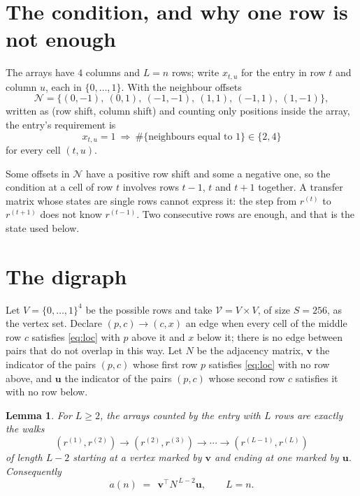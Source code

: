 \documentclass[11pt,a4paper]{article}
\theoremstyle{plain}
\newtheorem{lemma}[theorem]{Lemma}
\theoremstyle{definition}
\begin{document}
\section{The condition, and why one row is not enough}

The arrays have $4$ columns and $L=n$ rows; write $x_{t,u}$ for the entry in
row $t$ and column $u$, each in $\{0,\dots,1\}$. With the neighbour offsets
\[
\mathcal N=\{(0,-1),\ (0,1),\ (-1,-1),\ (1,1),\ (-1,1),\ (1,-1)\},
\]
written as (row shift, column shift) and counting only positions inside the array, the
entry's requirement is
\begin{equation}\label{eq:loc}
x_{t,u}=1\ \Rightarrow\ \#\{\text{neighbours equal to }1\}\in\{2,4\}
\end{equation}
for every cell $(t,u)$.

Some offsets in $\mathcal N$ have a positive row shift and some a negative one, so the
condition at a cell of row $t$ involves rows $t-1$, $t$ and $t+1$ together. A transfer
matrix whose states are single rows cannot express it: the step from $r^{(t)}$ to
$r^{(t+1)}$ does not know $r^{(t-1)}$. Two consecutive rows are enough, and that is
the state used below.

\section{The digraph}

Let $V=\{0,\dots,1\}^{4}$ be the possible rows and take
$\mathcal V=V\times V$, of size $S=256$, as the vertex set. Declare $(p,c)\to(c,x)$ an edge
when every cell of the middle row $c$ satisfies \eqref{eq:loc} with $p$ above it and $x$
below it; there is no edge between pairs that do not overlap in this way. Let $N$ be the
adjacency matrix, $\mathbf{v}$ the indicator of the pairs $(p,c)$ whose first row $p$
satisfies \eqref{eq:loc} with no row above, and $\mathbf{u}$ the indicator of
the pairs $(p,c)$ whose second row $c$ satisfies it with no row below.

\begin{lemma}\label{lem:walk}
For $L\ge2$, the arrays counted by the entry with $L$ rows are exactly the walks
\[
(r^{(1)},r^{(2)})\to(r^{(2)},r^{(3)})\to\cdots\to(r^{(L-1)},r^{(L)})
\]
of length $L-2$ starting at a vertex marked by $\mathbf{v}$ and ending at one marked by
$\mathbf{u}$. Consequently
\[
a(n)\;=\;\,\mathbf{v}^{\!\top}N^{\,L-2}\mathbf{u},\qquad L=n .
\]
\end{lemma}
\end{document}

